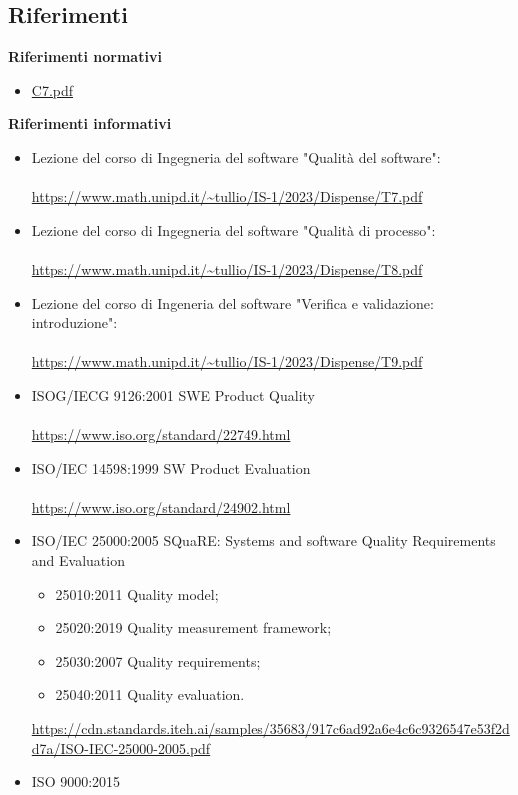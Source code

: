 \documentclass{article}
\begin{document}
{\subsection{Riferimenti}
\textbf{Riferimenti normativi}
\begin{itemize}
    \item \href{https://www.math.unipd.it/~tullio/IS-1/2023/Progetto/C7.pdf}{C7.pdf}
\end{itemize}
\textbf{Riferimenti informativi}
\begin{itemize}
    \item Lezione del corso di Ingegneria del software "Qualità del software": \\ \\
    \url{https://www.math.unipd.it/~tullio/IS-1/2023/Dispense/T7.pdf}
    \item Lezione del corso di Ingegneria del software "Qualità di processo": \\ \\
    \url{https://www.math.unipd.it/~tullio/IS-1/2023/Dispense/T8.pdf}
    \item Lezione del corso di Ingeneria del software "Verifica e validazione: introduzione": \\ \\
    \url{https://www.math.unipd.it/~tullio/IS-1/2023/Dispense/T9.pdf}
    \item ISOG/IECG 9126:2001 SWE Product Quality \\ \\
    \url{https://www.iso.org/standard/22749.html}
    \item ISO/IEC 14598:1999 SW Product Evaluation \\ \\
    \url{https://www.iso.org/standard/24902.html}
    \item  ISO/IEC 25000:2005 SQuaRE: Systems and software Quality Requirements and Evaluation 
        \begin{itemize}
        \item 25010:2011 Quality model;
        \item 25020:2019 Quality measurement framework;
        \item 25030:2007 Quality requirements;
        \item 25040:2011 Quality evaluation.
    \end{itemize}
    \url{https://cdn.standards.iteh.ai/samples/35683/917c6ad92a6e4c6c9326547e53f2dd7a/ISO-IEC-25000-2005.pdf}
    \item ISO 9000:2015 \\ \\

\end{itemize}}
\end{document}
